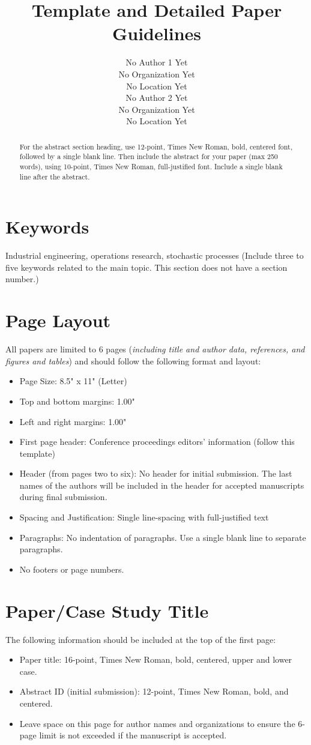 \documentclass[review]{iise}%
\title{\titlesize Template and Detailed Paper Guidelines}
\author{
No Author 1 Yet\\No Organization Yet\\No Location Yet \\
\vspace{0.3cm}%
No Author 2 Yet\\No Organization Yet\\No Location Yet}
\begin{document}
\maketitle

\begin{abstract}
{\small For the abstract section heading, use 12-point, Times New Roman, bold, centered font, followed by a single blank line.  Then include the abstract for your paper (max 250 words), using 10-point, Times New Roman, full-justified font.  Include a single blank line after the abstract.}
\end{abstract}


\section*{Keywords}
Industrial engineering, operations research, stochastic processes (Include three to five keywords related to the main topic. This section does not have a section number.)


\section{Page Layout}
All papers are limited to 6 pages (\textit{including title and author data, references, and figures and tables}) and should follow the following format and layout: 
\begin{itemize}
\item Page Size: 8.5" x 11" (Letter)
\item Top and bottom margins: 1.00"
\item Left and right margins: 1.00"
\item First page header: Conference proceedings editors’ information (follow this template)
\item Header (from pages two to six):  No header for initial submission. The last names of the authors will be included in the header for accepted manuscripts during final submission.
\item Spacing and Justification:  Single line-spacing with full-justified text
\item Paragraphs: No indentation of paragraphs. Use a single blank line to separate paragraphs.
\item No footers or page numbers.
\end{itemize}

\section{Paper/Case Study Title}
The following information should be included at the top of the first page: 
\begin{itemize}
\item Paper title:  16-point, Times New Roman, bold, centered, upper and lower case.
\item Abstract ID (initial submission): 12-point, Times New Roman, bold, and centered.
\item Leave space on this page for author names and organizations to ensure the 6-page limit is not exceeded if the manuscript is accepted.
\end{itemize}
\end{document}
